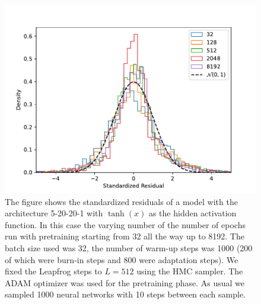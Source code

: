 \begin{figure}
    \centering
    \includegraphics[scale=0.8]{figures/standardized_residuals/effect_of_pretraining/standardized_residuals_hmc_vs_pretraining_steps.pdf}
    \caption{The figure shows the standardized residuals of a model with the architecture 5-20-20-1 with $\tanh(x)$ as the
    hidden activation function. In this case the varying number of the number of epochs run with pretraining starting from 32 all the way up to 8192. The batch size used was 32, the number of warm-up steps was 1000 (200 of which were burn-in steps and 800 were adaptation steps). We fixed the Leapfrog steps to $L = 512$ using the HMC sampler. The ADAM optimizer was used for the pretraining phase. As usual we sampled 1000 neural networks with 10 steps between each sample.
    }
    \label{fig:std_residual_vs_pretraining}
\end{figure}

